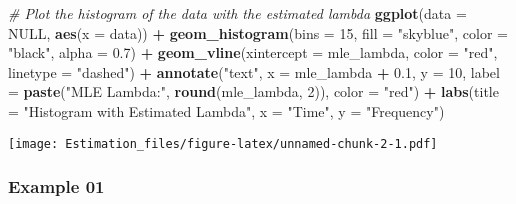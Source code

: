 \documentclass[
]{article}
\newenvironment{Shaded}{\begin{snugshade}}{\end{snugshade}}
\newcommand{\AttributeTok}[1]{\textcolor[rgb]{0.13,0.29,0.53}{#1}}
\newcommand{\CommentTok}[1]{\textcolor[rgb]{0.56,0.35,0.01}{\textit{#1}}}
\newcommand{\ConstantTok}[1]{\textcolor[rgb]{0.56,0.35,0.01}{#1}}
\newcommand{\DecValTok}[1]{\textcolor[rgb]{0.00,0.00,0.81}{#1}}
\newcommand{\FloatTok}[1]{\textcolor[rgb]{0.00,0.00,0.81}{#1}}
\newcommand{\FunctionTok}[1]{\textcolor[rgb]{0.13,0.29,0.53}{\textbf{#1}}}
\newcommand{\NormalTok}[1]{#1}
\newcommand{\SpecialCharTok}[1]{\textcolor[rgb]{0.81,0.36,0.00}{\textbf{#1}}}
\newcommand{\StringTok}[1]{\textcolor[rgb]{0.31,0.60,0.02}{#1}}
\begin{document}
\begin{Shaded}
\begin{Highlighting}[]
\CommentTok{\# Plot the histogram of the data with the estimated lambda}
\FunctionTok{ggplot}\NormalTok{(}\AttributeTok{data =} \ConstantTok{NULL}\NormalTok{, }\FunctionTok{aes}\NormalTok{(}\AttributeTok{x =}\NormalTok{ data)) }\SpecialCharTok{+}
  \FunctionTok{geom\_histogram}\NormalTok{(}\AttributeTok{bins =} \DecValTok{15}\NormalTok{, }\AttributeTok{fill =} \StringTok{"skyblue"}\NormalTok{, }\AttributeTok{color =} \StringTok{"black"}\NormalTok{, }\AttributeTok{alpha =} \FloatTok{0.7}\NormalTok{) }\SpecialCharTok{+}
  \FunctionTok{geom\_vline}\NormalTok{(}\AttributeTok{xintercept =}\NormalTok{ mle\_lambda, }\AttributeTok{color =} \StringTok{"red"}\NormalTok{, }\AttributeTok{linetype =} \StringTok{"dashed"}\NormalTok{) }\SpecialCharTok{+}
  \FunctionTok{annotate}\NormalTok{(}\StringTok{"text"}\NormalTok{, }\AttributeTok{x =}\NormalTok{ mle\_lambda }\SpecialCharTok{+} \FloatTok{0.1}\NormalTok{, }\AttributeTok{y =} \DecValTok{10}\NormalTok{, }
           \AttributeTok{label =} \FunctionTok{paste}\NormalTok{(}\StringTok{"MLE Lambda:"}\NormalTok{, }\FunctionTok{round}\NormalTok{(mle\_lambda, }\DecValTok{2}\NormalTok{)), }\AttributeTok{color =} \StringTok{"red"}\NormalTok{) }\SpecialCharTok{+}
  \FunctionTok{labs}\NormalTok{(}\AttributeTok{title =} \StringTok{"Histogram with Estimated Lambda"}\NormalTok{, }\AttributeTok{x =} \StringTok{"Time"}\NormalTok{, }\AttributeTok{y =} \StringTok{"Frequency"}\NormalTok{)}
\end{Highlighting}
\end{Shaded}

\texttt{[image: Estimation\_files/figure-latex/unnamed-chunk-2-1.pdf]}

\subsubsection{Example 01}\label{example-01}
\end{document}

